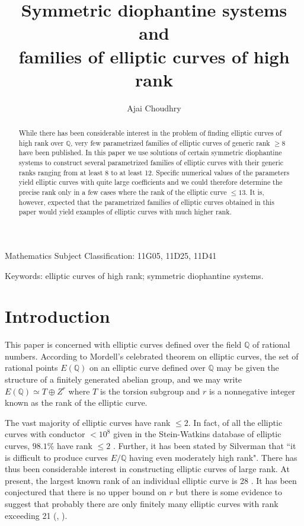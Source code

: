 \documentclass[11pt, leqno]{article}
\begin{document}
\author{Ajai Choudhry}
\title{Symmetric diophantine systems and\\ families of  elliptic curves of high rank}
\date{}
\maketitle


\begin{abstract} 
While there has been considerable interest in the problem of finding elliptic curves of high rank over $\mathbb{Q}$, very few parametrized families of elliptic curves of generic rank $\geq 8$ have been published. In this paper we use solutions of certain symmetric diophantine systems to construct several parametrized families of elliptic curves with their generic ranks ranging from at least 8 to at least 12. Specific numerical values of the parameters yield elliptic curves with quite large coefficients and we could therefore determine the precise rank only in a few cases where the rank of the elliptic curve $\leq 13$. It is, however, expected that the parametrized families of elliptic curves obtained in this paper would yield examples of elliptic curves with much higher rank. 
\end{abstract}

Mathematics Subject Classification: 11G05, 11D25, 11D41 

Keywords: elliptic curves of high rank; symmetric diophantine systems.



\section{Introduction}

This paper is concerned with elliptic curves defined over the field $\mathbb{Q}$ of rational numbers. According to Mordell's celebrated theorem on elliptic curves, the set of rational points $E(\mathbb{Q})$ on an elliptic curve defined over $\mathbb{Q}$ may be given the structure of a finitely generated  abelian group, and we may write
$E(\mathbb{Q}) \simeq T \oplus Z^r$  where $T$ is the torsion subgroup and $r$ is a nonnegative integer known as the rank of the elliptic curve. 


The vast majority of elliptic curves have rank  $ \leq 2$. In fact, of all the elliptic curves with conductor $< 10^8$ given in the Stein-Watkins database of elliptic curves, $98.1\%$  have rank $\leq 2$ \cite[p. 251]{BMSW}. Further, it has been stated by Silverman \cite[p. 254]{Si} that ``it is difficult to produce curves $E/\mathbb{Q}$ having even moderately high rank".   There has thus been considerable interest in constructing elliptic curves of large rank. At present, the largest known rank of an individual elliptic curve is 28 \cite{El}. It has been conjectured that there is no upper bound on $r$ \cite[p. 254]{Si} but there is some  evidence to suggest that probably there are only finitely many elliptic curves with rank exceeding 21 (\cite{PP}, \cite{Po}). 
\end{document}
